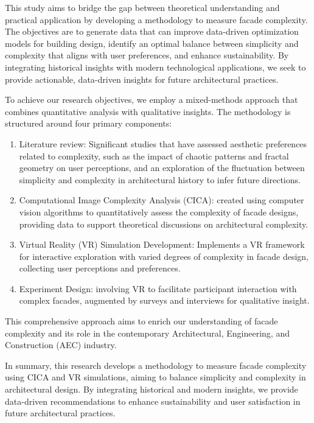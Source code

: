 This study aims to bridge the gap between theoretical understanding and practical application by developing a methodology to measure facade complexity.
The objectives are to generate data that can improve data-driven optimization models for building design, identify an optimal balance between simplicity and complexity that aligns with user preferences, and enhance sustainability.
By integrating historical insights with modern technological applications, we seek to provide actionable, data-driven insights for future architectural practices.

To achieve our research objectives, we employ a mixed-methods approach that combines quantitative analysis with qualitative insights.
The methodology is structured around four primary components:

\begin{enumerate}
    \item Literature review: Significant studies that have assessed aesthetic preferences related to complexity, such as the impact of chaotic patterns and fractal geometry on user perceptions, and an exploration of the fluctuation between simplicity and complexity in architectural history to infer future directions.
    \item Computational Image Complexity Analysis (CICA): created using computer vision algorithms to quantitatively assess the complexity of facade designs, providing data to support theoretical discussions on architectural complexity.
    \item Virtual Reality (VR) Simulation Development: Implements a VR framework for interactive exploration with varied degrees of complexity in facade design, collecting user perceptions and preferences.
    \item Experiment Design: involving VR to facilitate participant interaction with complex facades, augmented by surveys and interviews for qualitative insight.
\end{enumerate}

This comprehensive approach aims to enrich our understanding of facade complexity and its role in the contemporary Architectural, Engineering, and Construction (AEC) industry.

In summary, this research develops a methodology to measure facade complexity using CICA and VR simulations, aiming to balance simplicity and complexity in architectural design.
 By integrating historical and modern insights, we provide data-driven recommendations to enhance sustainability and user satisfaction in future architectural practices.





%
